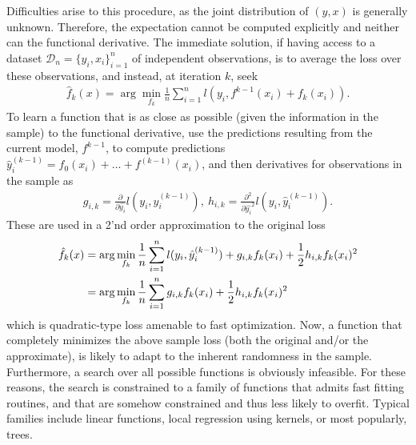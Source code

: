 Difficulties arise to this procedure, as the joint distribution of $(y,x)$ is generally unknown. Therefore, the expectation cannot be computed explicitly and neither can the functional derivative.
The immediate solution, if having access to a dataset $\mathcal{D}_n=\{y_i,x_i\}_{i=1}^n$ of independent observations, is to average the loss over these observations, and instead, at iteration $k$, seek
\begin{align}
	\hat{f}_k(x) = \arg\min_{f_k} \frac{1}{n}\sum_{i=1}^{n} l\left( y_i, f^{k-1}(x_i)+f_k(x_i) \right).
\end{align}
To learn a function that is as close as possible (given the information in the sample) to the functional derivative, use the predictions resulting from the current model, $f^{k-1}$, to compute predictions $\hat{y}_i^{(k-1)}=f_0(x_i)+\dots+f^{(k-1)}(x_i)$, and then derivatives for observations in the sample as 
\begin{align}\label{eq:gb-derivatives}
g_{i,k} = \frac{\partial}{\partial \hat{y_i}}l(y_i,\hat{y}_i^{(k-1)})
,~
h_{i,k} = \frac{\partial^2}{\partial \hat{y_i}^2}l(y_i,\hat{y}_i^{(k-1)}).
\end{align}
These are used in a 2'nd order approximation to the original loss
\begin{align}\label{eq:gb-iteration-loss}
	\hat{f}_k(x) &= \arg\min_{f_k}
	\frac{1}{n}\sum_{i=1}^{n}l(y_i,\hat{y}_i^{(k-1)}) + g_{i,k}f_k(x_i) + \frac{1}{2}h_{i,k}f_k(x_i)^2
	\notag \\
	&= \arg\min_{f_k} \frac{1}{n}\sum_{i=1}^{n} g_{i,k}f_k(x_i) + \frac{1}{2}h_{i,k}f_k(x_i)^2
\end{align}
which is quadratic-type loss amenable to fast optimization.
Now, a function that completely minimizes the above sample loss (both the original and/or the approximate), is likely to adapt to the inherent randomness in the sample.
Furthermore, a search over all possible functions is obviously infeasible.
For these reasons, the search is constrained to a family of functions that admits fast fitting routines, and that are somehow constrained and thus less likely to overfit.
Typical families include linear functions, local regression using kernels, or most popularly, trees.


